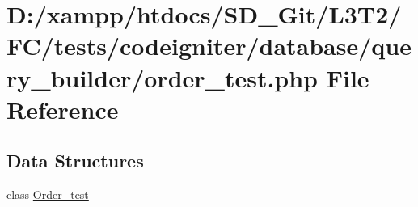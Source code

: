 \hypertarget{tests_2codeigniter_2database_2query__builder_2order__test_8php}{}\section{D\+:/xampp/htdocs/\+S\+D\+\_\+\+Git/\+L3\+T2/\+F\+C/tests/codeigniter/database/query\+\_\+builder/order\+\_\+test.php File Reference}
\label{tests_2codeigniter_2database_2query__builder_2order__test_8php}
\subsection*{Data Structures}
\begin{DoxyCompactItemize}
\item 
class \hyperlink{class_order__test}{Order\+\_\+test}
\end{DoxyCompactItemize}

